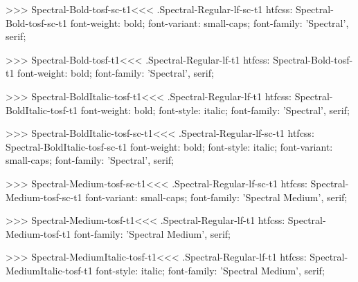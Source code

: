 >>>
\<Spectral-Bold-tosf-sc-t1\><<<
.Spectral-Regular-lf-sc-t1
htfcss:  Spectral-Bold-tosf-sc-t1  font-weight: bold; font-variant: small-caps; font-family: 'Spectral', serif;

>>>
\<Spectral-Bold-tosf-t1\><<<
.Spectral-Regular-lf-t1
htfcss:  Spectral-Bold-tosf-t1  font-weight: bold; font-family: 'Spectral', serif;

>>>
\<Spectral-BoldItalic-tosf-t1\><<<
.Spectral-Regular-lf-t1
htfcss:  Spectral-BoldItalic-tosf-t1  font-weight: bold; font-style: italic; font-family: 'Spectral', serif;

>>>
\<Spectral-BoldItalic-tosf-sc-t1\><<<
.Spectral-Regular-lf-sc-t1
htfcss:  Spectral-BoldItalic-tosf-sc-t1  font-weight: bold; font-style: italic; font-variant: small-caps; font-family: 'Spectral', serif;

>>>
\<Spectral-Medium-tosf-sc-t1\><<<
.Spectral-Regular-lf-sc-t1
htfcss:  Spectral-Medium-tosf-sc-t1  font-variant: small-caps; font-family: 'Spectral Medium', serif;

>>>
\<Spectral-Medium-tosf-t1\><<<
.Spectral-Regular-lf-t1
htfcss:  Spectral-Medium-tosf-t1  font-family: 'Spectral Medium', serif;

>>>
\<Spectral-MediumItalic-tosf-t1\><<<
.Spectral-Regular-lf-t1
htfcss:  Spectral-MediumItalic-tosf-t1  font-style: italic; font-family: 'Spectral Medium', serif;

